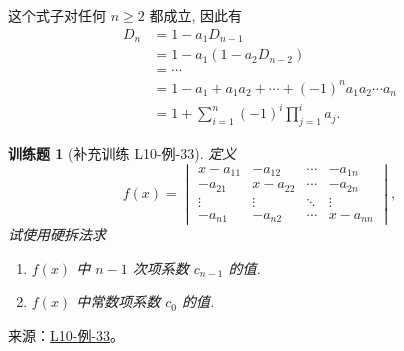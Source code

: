 \documentclass[12pt,fontset=fandol]{ctexart}
\newtheorem{exercise}{训练题}[section]
\begin{document}
\begin{solve}
    这个式子对任何 $n \geqslant 2$ 都成立, 因此有
    \begin{align*}
        D_n & =1-a_{1} D_{n-1}                                          \\
            & =1-a_{1}(1-a_{2} D_{n-2})                                 \\
            & =\cdots                                                   \\
            & =1-a_{1}+a_{1} a_{2}+\cdots+(-1)^n a_{1} a_{2} \cdots a_n \\
            & =1+\sum_{i=1}^{n}(-1)^i \prod_{j=1}^i a_j.
    \end{align*}
\end{solve}

\begin{exercise}[补充训练 L10-例-33]\label{prob:L10-例-33}
定义
    \[
        f(x) = \begin{vmatrix}
            x - a_{11} & - a_{12} & \cdots & - a_{1n} \\
            - a_{21} & x - a_{22} & \cdots & - a_{2n} \\
            \vdots   & \vdots   & \ddots & \vdots   \\
            - a_{n1} & - a_{n2} & \cdots & x - a_{nn}
        \end{vmatrix},
    \]
    试使用硬拆法求
    \begin{enumerate}
        \item $f(x)$ 中 $n-1$ 次项系数 $c_{n-1}$ 的值.
        \item $f(x)$ 中常数项系数 $c_0$ 的值.
    \end{enumerate}
\end{exercise}
\noindent 来源：\href{https://github.com/yhwu-is/Linear-Algebra-Left-Undone/blob/new/%E8%AE%B2%E4%B9%89/%E4%B8%93%E9%A2%98/10%20%E8%A1%8C%E5%88%97%E5%BC%8F.tex}{L10-例-33}。
\end{document}
